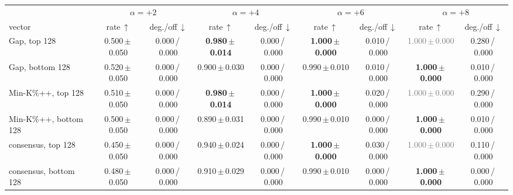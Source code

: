 \begin{tabular}{@{}lcccccccc@{}}
\toprule
& \multicolumn{2}{c}{$\alpha=+2$} & \multicolumn{2}{c}{$\alpha=+4$} & \multicolumn{2}{c}{$\alpha=+6$} & \multicolumn{2}{c}{$\alpha=+8$} \\
\cmidrule(lr){2-3}\cmidrule(lr){4-5}\cmidrule(lr){6-7}\cmidrule(lr){8-9}
vector & rate\,$\uparrow$ & deg./off\,$\downarrow$ & rate\,$\uparrow$ & deg./off\,$\downarrow$ & rate\,$\uparrow$ & deg./off\,$\downarrow$ & rate\,$\uparrow$ & deg./off\,$\downarrow$ \\
\midrule
Gap, top 128 & 0.500\,{\scriptsize$\pm$\,0.050} & {\scriptsize 0.000\,/\,0.000} & \textbf{0.980\,{\scriptsize$\pm$\,0.014}} & {\scriptsize 0.000\,/\,0.000} & \textbf{1.000\,{\scriptsize$\pm$\,0.000}} & {\scriptsize 0.010\,/\,0.000} & \textcolor{gray}{1.000\,{\scriptsize$\pm$\,0.000}} & {\scriptsize 0.280\,/\,0.000} \\
Gap, bottom 128 & 0.520\,{\scriptsize$\pm$\,0.050} & {\scriptsize 0.000\,/\,0.000} & 0.900\,{\scriptsize$\pm$\,0.030} & {\scriptsize 0.000\,/\,0.000} & 0.990\,{\scriptsize$\pm$\,0.010} & {\scriptsize 0.010\,/\,0.000} & \textbf{1.000\,{\scriptsize$\pm$\,0.000}} & {\scriptsize 0.010\,/\,0.000} \\
Min-K\%++, top 128 & 0.510\,{\scriptsize$\pm$\,0.050} & {\scriptsize 0.000\,/\,0.000} & \textbf{0.980\,{\scriptsize$\pm$\,0.014}} & {\scriptsize 0.000\,/\,0.000} & \textbf{1.000\,{\scriptsize$\pm$\,0.000}} & {\scriptsize 0.020\,/\,0.000} & \textcolor{gray}{1.000\,{\scriptsize$\pm$\,0.000}} & {\scriptsize 0.290\,/\,0.000} \\
Min-K\%++, bottom 128 & 0.500\,{\scriptsize$\pm$\,0.050} & {\scriptsize 0.000\,/\,0.000} & 0.890\,{\scriptsize$\pm$\,0.031} & {\scriptsize 0.000\,/\,0.000} & 0.990\,{\scriptsize$\pm$\,0.010} & {\scriptsize 0.000\,/\,0.000} & \textbf{1.000\,{\scriptsize$\pm$\,0.000}} & {\scriptsize 0.010\,/\,0.000} \\
consensus, top 128 & 0.450\,{\scriptsize$\pm$\,0.050} & {\scriptsize 0.000\,/\,0.000} & 0.940\,{\scriptsize$\pm$\,0.024} & {\scriptsize 0.000\,/\,0.000} & \textbf{1.000\,{\scriptsize$\pm$\,0.000}} & {\scriptsize 0.030\,/\,0.000} & \textcolor{gray}{1.000\,{\scriptsize$\pm$\,0.000}} & {\scriptsize 0.110\,/\,0.000} \\
consensus, bottom 128 & 0.480\,{\scriptsize$\pm$\,0.050} & {\scriptsize 0.000\,/\,0.000} & 0.910\,{\scriptsize$\pm$\,0.029} & {\scriptsize 0.000\,/\,0.000} & 0.990\,{\scriptsize$\pm$\,0.010} & {\scriptsize 0.000\,/\,0.000} & \textbf{1.000\,{\scriptsize$\pm$\,0.000}} & {\scriptsize 0.000\,/\,0.000} \\

\end{tabular}
